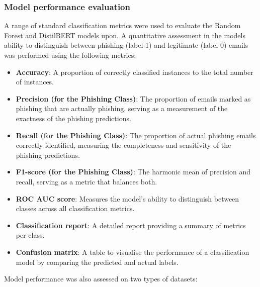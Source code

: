 
\subsubsection*{Model performance evaluation}
A range of standard classification metrics were used to evaluate the Random Forest and DistilBERT models upon. A quantitative assessment in the models ability to distinguish between phishing (label 1) and legitimate (label 0) emails was performed using the following metrics:

\begin{itemize}
  \item \textbf{Accuracy}: A proportion of correctly classified instances to the total number of instances.
  \item \textbf{Precision (for the Phishing Class)}: The proportion of emails marked as phishing that are actually phishing, serving as a measurement of the exactness of the phishing predictions.
  \item \textbf{Recall (for the Phishing Class)}: The proportion of actual phishing emails correctly identified, measuring the completeness and sensitivity of the phishing predictions.
  \item \textbf{F1-score (for the Phishing Class)}: The harmonic mean of precision and recall, serving as a metric that balances both.
  \item \textbf{ROC AUC score}: Measures the model's ability to distinguish between classes across all classification metrics.
  \item \textbf{Classification report}: A detailed report providing a summary of metrics per class.
  \item \textbf{Confusion matrix}: A table to visualise the performance of a classification model by comparing the predicted and actual labels.
\end{itemize}

\noindent Model performance was also assessed on two types of datasets:

